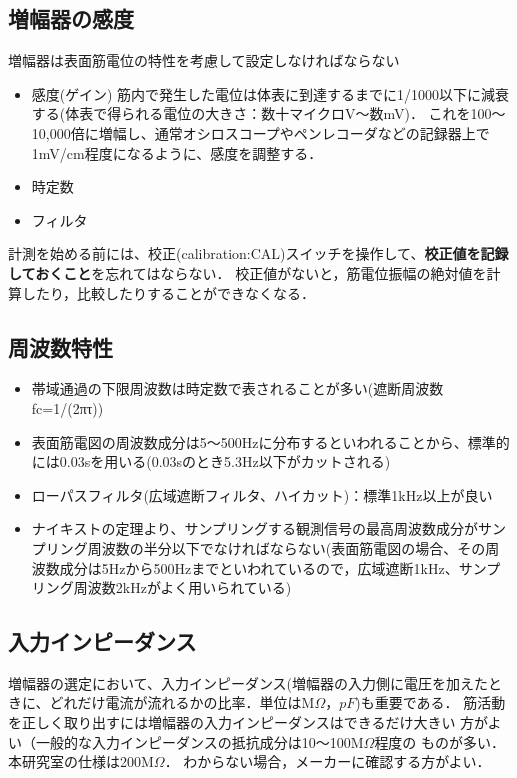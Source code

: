 \documentclass[10pt,twocolumn]{jarticle}
\begin{document}
\subsection{増幅器の感度}

増幅器は表面筋電位の特性を考慮して設定しなければならない

\begin{itemize}
\item 感度(ゲイン)
	筋内で発生した電位は体表に到達するまでに1/1000以下に減衰する(体表で得られる電位の大きさ：数十マイクロV〜数mV)．
	これを100〜10,000倍に増幅し、通常オシロスコープやペンレコーダなどの記録器上で1mV/cm程度になるように、感度を調整する．
\item 時定数
\item フィルタ
\end{itemize}

計測を始める前には、校正(calibration:CAL)スイッチを操作して、{\bf 校正値を記録しておくこと}を忘れてはならない．
校正値がないと，筋電位振幅の絶対値を計算したり，比較したりすることができなくなる．

\subsection{周波数特性}

\begin{itemize}
\item 帯域通過の下限周波数は時定数で表されることが多い(遮断周波数fc=1/(2πτ))
\item 表面筋電図の周波数成分は5〜500Hzに分布するといわれることから、標準的には0.03sを用いる(0.03sのとき5.3Hz以下がカットされる)
\item ローパスフィルタ(広域遮断フィルタ、ハイカット)：標準1kHz以上が良い
\item ナイキストの定理より、サンプリングする観測信号の最高周波数成分がサンプリング周波数の半分以下でなければならない(表面筋電図の場合、その周波数成分は5Hzから500Hzまでといわれているので，広域遮断1kHz、サンプリング周波数2kHzがよく用いられている)
\end{itemize}

\subsection{入力インピーダンス}

増幅器の選定において、入力インピーダンス(増幅器の入力側に電圧を加えたときに、どれだけ電流が流れるかの比率．単位はM$\Omega$，$pF$)も重要である．
筋活動を正しく取り出すには増幅器の入力インピーダンスはできるだけ大きい
方がよい（一般的な入力インピーダンスの抵抗成分は10〜100M$\Omega$程度の
ものが多い．本研究室の仕様は200M$\Omega$．
わからない場合，メーカーに確認する方がよい．
\end{document}
